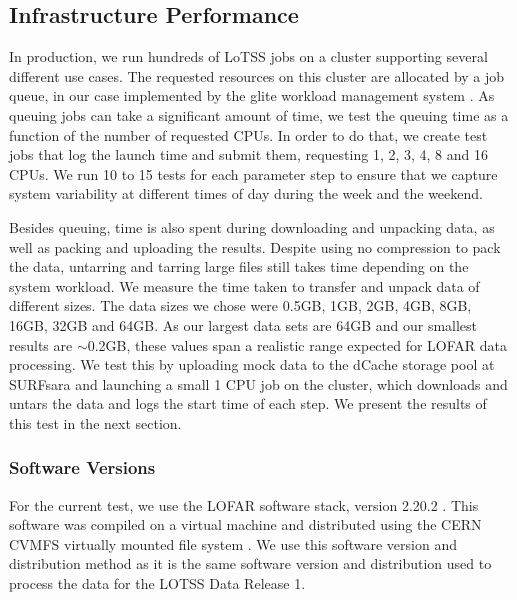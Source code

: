 \subsection{Infrastructure Performance}

In production, we run hundreds of LoTSS jobs on a cluster supporting several different use cases. The requested resources on this cluster are allocated by a job queue, in our case implemented by the glite workload management system \citep{glite-wms}. As queuing jobs can take a significant amount of time, we test the queuing time as a function of the number of requested CPUs. In order to do that, we create test jobs that log the launch time and submit them, requesting 1, 2, 3, 4, 8 and 16 CPUs. We run 10 to 15 tests for each parameter step to ensure that we capture system variability at different times of day during the week and the weekend. 

Besides queuing, time is also spent during downloading and unpacking data, as well as packing and uploading the results. Despite using no compression to pack the data, untarring and tarring large files still takes time depending on the system workload. We measure the time taken to transfer and unpack data of different sizes. The data sizes we chose were 0.5GB, 1GB, 2GB, 4GB, 8GB, 16GB, 32GB and 64GB. As our largest data sets are 64GB and our smallest results are $\sim$0.2GB, these values span a realistic range expected for LOFAR data processing. We test this by uploading mock data to the dCache storage pool at SURFsara and launching a small 1 CPU job on the cluster, which downloads and untars the data and logs the start time of each step. We present the results of this test in the next section. 


\subsubsection{Software Versions}\label{sec:ch6_software_versions}
For the current test, we use the LOFAR software stack, version 2.20.2 \citep{cookbook}. This software was compiled on a virtual machine and distributed using the CERN \Gls{CVMFS} virtually mounted file system \citep{cvmfs2008}. We use this software version and distribution method as it is the same software version and distribution used to process the data for the LOTSS Data Release 1. 

